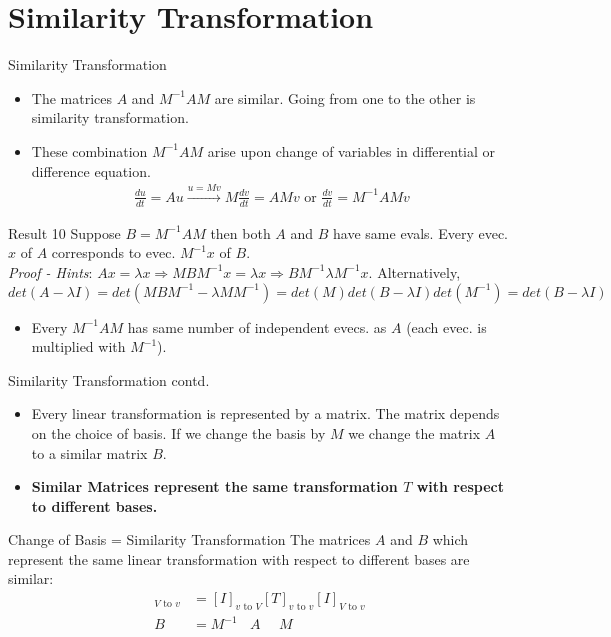 \documentclass{beamer}
\begin{document}
\section{Similarity Transformation}
\begin{frame}{Similarity Transformation}
\begin{itemize}
    \item The matrices $A$ and $M^{-1}AM$ are similar. Going from one to the other is similarity transformation.
    \item These combination $M^{-1}AM$ arise upon change of variables in differential or difference equation.
    \begin{align*}
        \frac{du}{dt} = Au \xrightarrow{u = Mv} M\frac{dv}{dt} = AMv \text{ or } \frac{dv}{dt} = M^{-1}AMv
    \end{align*}
\end{itemize}
\begin{block}{Result 10}
Suppose $B=M^{-1}AM$ then both $A$ and $B$ have same evals. Every evec. $x$ of $A$ corresponds to evec. $M^{-1}x$ of $B$.\\
\textit{Proof - Hints}: $Ax = \lambda x \Rightarrow MBM^{-1}x = \lambda x \Rightarrow BM^{-1} \lambda M^{-1}x$. Alternatively, $det(A-\lambda I) = det(MBM^{-1}-\lambda MM^{-1}) = det(M)det(B-\lambda I)det(M^{-1}) = det(B-\lambda I)$
\end{block}
\begin{itemize}
    \item Every $M^{-1}AM$ has same number of independent evecs. as $A$ (each evec. is multiplied with $M^{-1}$).
\end{itemize}
\end{frame}

\begin{frame}{Similarity Transformation contd.}
\begin{itemize}
    \item Every linear transformation is represented by a matrix. The matrix depends on the choice of basis. If we change the basis by $M$ we change the matrix $A$ to a similar matrix $B$.
    \item \textbf{Similar Matrices represent the same transformation $T$  with respect to different bases.}
\end{itemize}
\begin{exampleblock}{Change of Basis = Similarity Transformation}
The matrices $A$ and $B$ which represent the same linear transformation with respect to different bases are similar:\\
\begin{align*}
    [T]_{V \text{ to } v} &= [I]_{v \text{ to } V} [T]_{v \text{ to } v} [I]_{V \text{ to } v}\\
    B \ \ \ \ &= M^{-1}\ \ \ \ A\ \ \ \ \ \ M
\end{align*}
\end{exampleblock}
\end{frame}
\end{document}
